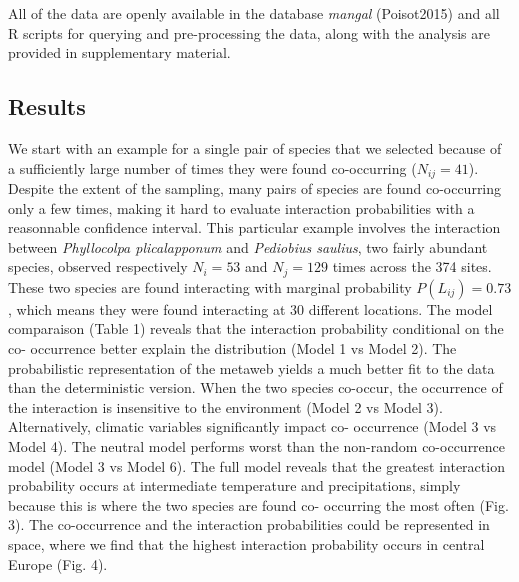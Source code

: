 \documentclass[12pt]{article}
\begin{document}
All of the data are openly available in the database \emph{mangal}
(Poisot2015) and all R scripts for querying and pre-processing the data, along
with the analysis are provided in supplementary material.

\subsection*{Results}  

We start with an example for a single pair of species that we selected because
of a sufficiently large number of times they were found co-occurring ($N_{ij}
= 41 $). Despite the extent of the sampling, many pairs of species are found
co-occurring only a few times, making it hard to evaluate interaction
probabilities with a reasonnable confidence interval. This particular example
involves the interaction between \textit{Phyllocolpa plicalapponum} and
\textit{Pediobius saulius}, two fairly abundant species, observed respectively
$N_i = 53$ and $N_j = 129$ times across the 374 sites. These two species are
found interacting with marginal probability $P(L_{ij}) = 0.73$, which means
they were found interacting at 30 different locations. The model comparaison
(Table 1) reveals that the interaction probability conditional on the co-
occurrence better explain the distribution (Model 1 vs Model 2). The
probabilistic representation of the metaweb yields a much better fit to the
data than the deterministic version. When the two species co-occur, the
occurrence of the interaction is insensitive to the environment (Model 2 vs
Model 3). Alternatively, climatic variables significantly impact co-
occurrence (Model 3 vs Model 4). The neutral model performs worst than the
non-random co-occurrence model (Model 3 vs Model 6). The full model reveals
that the greatest interaction probability occurs at intermediate temperature
and precipitations, simply because this is where the two species are found co-
occurring the most often (Fig. 3). The co-occurrence and the interaction
probabilities could be represented in space, where we find that the highest
interaction probability occurs in central Europe (Fig. 4).
\end{document}
